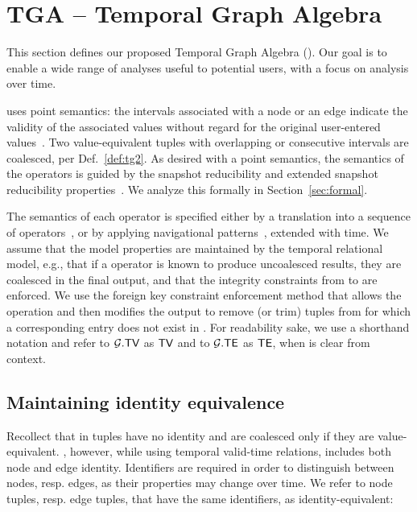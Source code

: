 \section{TGA -- Temporal Graph Algebra}
\label{sec:algebra}

This section defines our proposed Temporal Graph Algebra (\tga).  Our
goal is to enable a wide range of analyses useful to potential users,
with a focus on analysis over time.

\tga uses point semantics: the intervals associated with a node or an
edge indicate the validity of the associated values without regard for
the original user-entered values~\cite{DBLP:reference/db/JensenS09k}.
Two value-equivalent tuples with overlapping or consecutive intervals
are coalesced, per Def.~\ref{def:tg2}.  As desired with a point
semantics, the semantics of the \tga operators is guided by the
snapshot reducibility and extended snapshot reducibility
properties~\cite{Dignos2012}.  We analyze this formally in
Section~\ref{sec:formal}.

The semantics of each operator is specified either by a translation
into a sequence of \tra operators~\cite{Dignos2012}, or by applying
navigational patterns~\cite{DBLP:journals/corr/AnglesABHRV16},
extended with time.  We assume that the model properties are
maintained by the temporal relational model, e.g., that if a \tra
operator is known to produce uncoalesced results, they are coalesced
in the final output, and that the integrity constraints from \te to
\tv are enforced.  We use the foreign key constraint enforcement
method that allows the operation and then modifies the output to
remove (or trim) tuples from \te for which a corresponding entry does
not exist in \tv.  For readability sake, we use a shorthand notation
and refer to $\mathcal{G}.\textsf{TV}$ as $\textsf{TV}$ and to $\mathcal{G}.\textsf{TE}$ as $\textsf{TE}$, when \tve
is clear from context.

\subsection{Maintaining identity equivalence}

Recollect that in \tra tuples have no identity and are coalesced only
if they are value-equivalent.  \tga, however, while using temporal
valid-time relations, includes both node and edge identity.
Identifiers are required in order to distinguish between nodes,
resp. edges, as their properties may change over time.  We refer to
node tuples, resp. edge tuples, that have the same identifiers, as
identity-equivalent:

